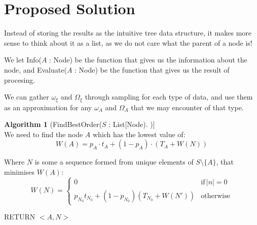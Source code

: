 \documentclass{article}
\theoremstyle{definition}
\newtheorem{algorithm}{Algorithm}
\begin{document}
\section{Proposed Solution}
Instead of storing the results as the intuitive tree data structure, it makes more
sense to think about it as a list, as we do not care what the parent of a node is!

We let Info($A$ : Node) be the function that gives us the information about the 
node, and Evaluate($A$ : Node) be the function that gives us the result of 
procesing.

We can gather $\omega_\xi$ and $\Omega_\xi$ through sampling for each type 
of data, and use them as an approximation for any $\omega_A$ and $\Omega_A$ that
we may encounter of that type.

\begin{algorithm}[FindBestOrder($S$ : List[Node])]\,\\
We need to find the node $A$ which has the lowest value of:
\[
	W(A) =  p_A \cdot t_A + (1 - p_A) \cdot (T_A + W(N))
\]

	Where $N$ is some a sequence formed from unique elements of $S \setminus \{A\}$, that minimises $W(A)$:
\[ 
	W(N) = 
	\begin{cases}
		0 & \text{if}\,|n| = 0 \\
		p_{N_0} t_{N_0} + (1 - p_{N_0}) (T_{N_0} + W(N')) & \text{otherwise}
	\end{cases}
\]

RETURN $<A, N>$
\end{algorithm}
\end{document}
